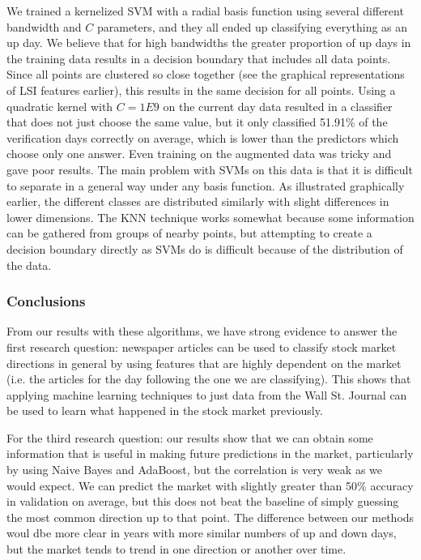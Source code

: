 \documentclass[10pt, twocolumn]{article}
\begin{document}
We trained a kernelized SVM with a radial basis function using several different bandwidth and $C$ parameters, and they all ended up classifying everything as an up day. We believe that for high bandwidths the greater proportion of up days in the training data results in a decision boundary that includes all data points. Since all points are clustered so close together (see the graphical representations of LSI features earlier), this results in the same decision for all points. Using a quadratic kernel with $C=1E9$ on the current day data resulted in a classifier that does not just choose the same value, but it only classified 51.91\% of the verification days correctly on average, which is lower than the predictors which choose only one answer. Even training on the augmented data was tricky and gave poor results. The main problem with SVMs on this data is that it is difficult to separate in a general way under any basis function. As illustrated graphically earlier, the different classes are distributed similarly with slight differences in lower dimensions. The KNN technique works somewhat because some information can be gathered from groups of nearby points, but attempting to create a decision boundary directly as SVMs do is difficult because of the distribution of the data.

\subsubsection{Conclusions}

From our results with these algorithms, we have strong evidence to answer the first research question: newspaper articles can be used to classify stock market directions in general by using features that are highly dependent on the market (i.e. the articles for the day following the one we are classifying). This shows that applying machine learning techniques to just data from the Wall St. Journal can be used to learn what happened in the stock market previously.

For the third research question: our results show that we can obtain some information that is useful in making future predictions in the market, particularly by using Naive Bayes and AdaBoost, but the correlation is very weak as we would expect. We can predict the market with slightly greater than 50\% accuracy in validation on average, but this does not beat the baseline of simply guessing the most common direction up to that point. The difference between our methods woul dbe more clear in years with more similar numbers of up and down days, but the market tends to trend in one direction or another over time. 
\end{document}
